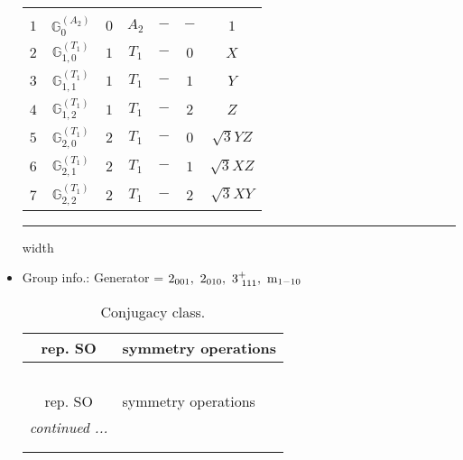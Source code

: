 \documentclass[fleqn,10pt,landscape]{article}
\begin{document}
\begin{itemize}
\begin{center}
\begin{longtable}{ccccccc}
 \hline \hline
\multicolumn{6}{r}{} \\ \endlastfoot

$ 1 $ & $ \mathbb{G}_{0}^{(A_{2})} $ & $ 0 $ & $ A_{2} $ & $ - $ & $ - $ & $ 1 $ \\ \hline
$ 2 $ & $ \mathbb{G}_{1,0}^{(T_{1})} $ & $ 1 $ & $ T_{1} $ & $ - $ & $ 0 $ & $ X $ \\
$ 3 $ & $ \mathbb{G}_{1,1}^{(T_{1})} $ & $ 1 $ & $ T_{1} $ & $ - $ & $ 1 $ & $ Y $ \\
$ 4 $ & $ \mathbb{G}_{1,2}^{(T_{1})} $ & $ 1 $ & $ T_{1} $ & $ - $ & $ 2 $ & $ Z $ \\ \hline
$ 5 $ & $ \mathbb{G}_{2,0}^{(T_{1})} $ & $ 2 $ & $ T_{1} $ & $ - $ & $ 0 $ & $ \sqrt{3} Y Z $ \\
$ 6 $ & $ \mathbb{G}_{2,1}^{(T_{1})} $ & $ 2 $ & $ T_{1} $ & $ - $ & $ 1 $ & $ \sqrt{3} X Z $ \\
$ 7 $ & $ \mathbb{G}_{2,2}^{(T_{1})} $ & $ 2 $ & $ T_{1} $ & $ - $ & $ 2 $ & $ \sqrt{3} X Y $ \\
\end{longtable}
\end{center}

 \hfil \hrule height 1mm width \textwidth \hfil

\item Group info.: Generator = $2{}_{001},\,\,2{}_{010},\,\,3^{+}_{\,\,111},\,\,{\rm m}_{1-10}$

\begin{center}
\renewcommand{\arraystretch}{1.3}
\begin{longtable}{c|l}
\caption{Conjugacy class.}
 \\
 \hline \hline
rep. SO & symmetry operations \\ \hline \endfirsthead

\multicolumn{1}{l}{\tablename\ \thetable{}} \\
 \hline \hline
rep. SO & symmetry operations \\ \hline \endhead

 \hline \hline
\multicolumn{1}{r}{\footnotesize\it continued ...} \\ \endfoot

 \hline \hline
\multicolumn{1}{r}{} \\ \endlastfoot


\end{longtable}
\end{center}
\end{itemize}
\end{document}
